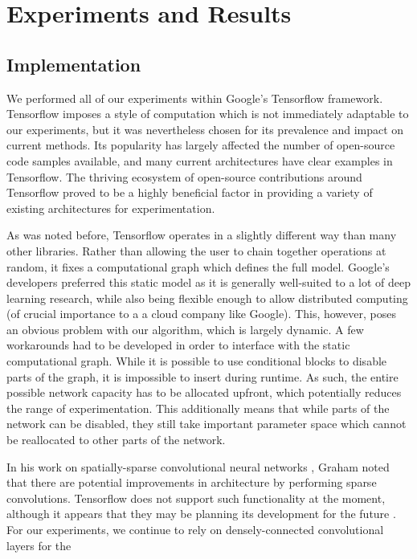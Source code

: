\chapter{Experiments and Results}
\section{Implementation}
We performed all of our experiments within Google's Tensorflow \cite{abadi2016tensorflow} framework.
Tensorflow imposes a style of computation which is not immediately adaptable to our experiments, but it was nevertheless chosen for its prevalence and impact on current methods.
Its popularity has largely affected the number of open-source code samples available, and many current architectures have clear examples in Tensorflow.
The thriving ecosystem of open-source contributions around Tensorflow proved to be a highly beneficial factor in providing a variety of existing architectures for experimentation.

As was noted before, Tensorflow operates in a slightly different way than many other libraries.
Rather than allowing the user to chain together operations at random, it fixes a computational graph which defines the full model.
Google's developers preferred this static model as it is generally well-suited to a lot of deep learning research, while also being flexible enough to allow distributed computing (of crucial importance to a a cloud company like Google).
This, however, poses an obvious problem with our algorithm, which is largely dynamic.
A few workarounds had to be developed in order to interface with the static computational graph.
While it is possible to use conditional blocks to disable parts of the graph, it is impossible to insert during runtime.
As such, the entire possible network capacity has to be allocated upfront, which potentially reduces the range of experimentation.
This additionally means that while parts of the network can be disabled, they still take important parameter space which cannot be reallocated to other parts of the network.

In his work on spatially-sparse convolutional neural networks \cite{graham2014spatially}, Graham noted that there are potential improvements in architecture by performing sparse convolutions.
Tensorflow does not support such functionality at the moment, although it appears that they may be planning its development for the future \cite{spatiallysparseconv}.
For our experiments, we continue to rely on densely-connected convolutional layers for the

